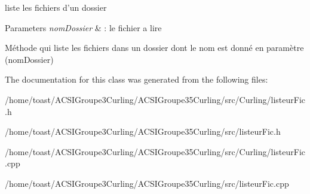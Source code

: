 liste les fichiers d'un dossier 


\begin{DoxyParams}{Parameters}
{\em nom\-Dossier} & \-: le fichier a lire\\
\hline
\end{DoxyParams}
Méthode qui liste les fichiers dans un dossier dont le nom est donné en paramètre (nom\-Dossier) 

The documentation for this class was generated from the following files\-:\begin{DoxyCompactItemize}
\item 
/home/toast/\-A\-C\-S\-I\-Groupe3\-Curling/\-A\-C\-S\-I\-Groupe35\-Curling/src/\-Curling/listeur\-Fic.\-h\item 
/home/toast/\-A\-C\-S\-I\-Groupe3\-Curling/\-A\-C\-S\-I\-Groupe35\-Curling/src/listeur\-Fic.\-h\item 
/home/toast/\-A\-C\-S\-I\-Groupe3\-Curling/\-A\-C\-S\-I\-Groupe35\-Curling/src/\-Curling/listeur\-Fic.\-cpp\item 
/home/toast/\-A\-C\-S\-I\-Groupe3\-Curling/\-A\-C\-S\-I\-Groupe35\-Curling/src/listeur\-Fic.\-cpp\end{DoxyCompactItemize}
